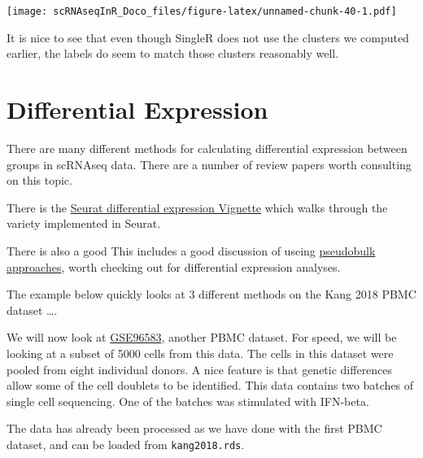 \documentclass[
]{book}
\begin{document}
\texttt{[image: scRNAseqInR\_Doco\_files/figure-latex/unnamed-chunk-40-1.pdf]}

It is nice to see that even though SingleR does not use the clusters we computed earlier, the labels do seem to match those clusters reasonably well.

\hypertarget{de2}{%
\chapter{Differential Expression}\label{de2}}

There are many different methods for calculating differential expression between groups in scRNAseq data. There are a number of review papers worth consulting on this topic.

There is the \href{https://satijalab.org/seurat/archive/v3.1/de_vignette.html}{Seurat differential expression Vignette} which walks through the variety implemented in Seurat.

There is also a good
This includes a good discussion of useing \href{http://bioconductor.org/books/3.15/OSCA.multisample/multi-sample-comparisons.html\#creating-pseudo-bulk-samples}{pseudobulk approaches}, worth checking out for differential expression analyses.

The example below quickly looks at 3 different methods on the Kang 2018 PBMC dataset \ldots.

We will now look at \href{https://www.ncbi.nlm.nih.gov/geo/query/acc.cgi?acc=GSE96583}{GSE96583}, another PBMC dataset. For speed, we will be looking at a subset of 5000 cells from this data. The cells in this dataset were pooled from eight individual donors. A nice feature is that genetic differences allow some of the cell doublets to be identified. This data contains two batches of single cell sequencing. One of the batches was stimulated with IFN-beta.

The data has already been processed as we have done with the first PBMC dataset, and can be loaded from \texttt{kang2018.rds}.
\end{document}
